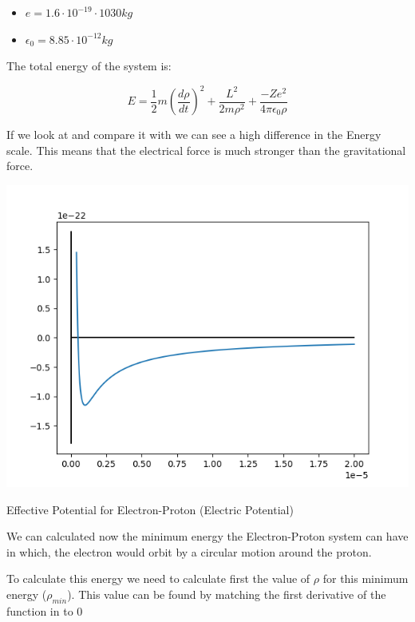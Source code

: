 \begin{itemize}
    \item $e = 1.6 \cdot 10^{-19} \cdot 10{30} kg$
    \item $\epsilon_0 = 8.85 \cdot 10^{-12} kg$
\end{itemize}

The total energy of the system is:

\begin{equation}
\label{energy_E-P_elec}
    E = \frac{1}{2}m\left(\frac{d\rho}{dt}\right)^2+\frac{L^2}{2m\rho^2}+ \frac{-Ze^2}{4\pi\epsilon_0\rho}
\end{equation}

If we look at  and compare it with  we can see a high difference in the Energy scale. This means that the electrical force is much stronger than the gravitational force.

\begin{marginfigure}
    \includegraphics{images/E-P_elec_Potential_Well.png}
    \caption[Effective Potential for Electron-Proton (Electric Potential)]{Effective Potential for Electron-Proton (Electric Potential)}
\end{marginfigure}

We can calculated now the minimum energy the Electron-Proton system can have in which, the electron would orbit by a circular motion around the proton.

To calculate this energy we need to calculate first the value of $\rho$ for this minimum energy ($\rho_{min}$). This value can be found by matching the first derivative of the function in  to 0

